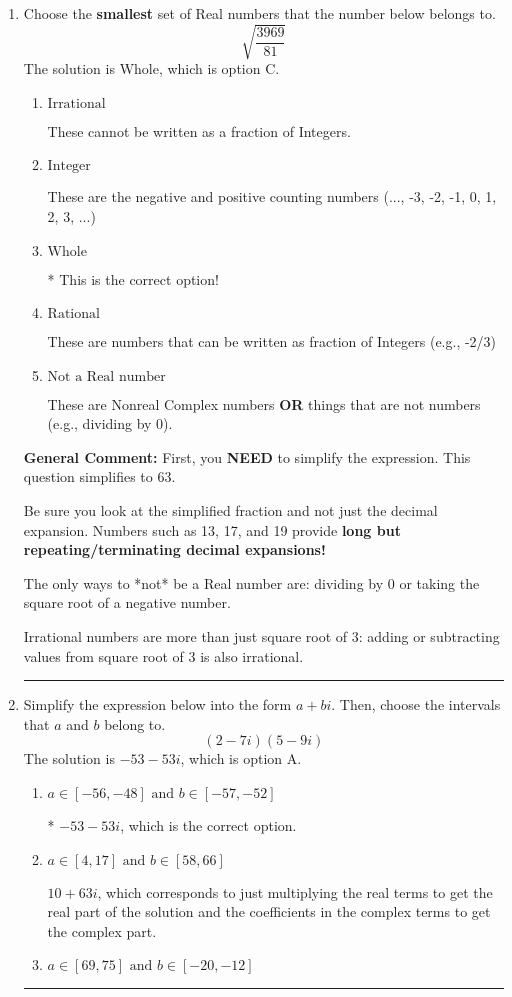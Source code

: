 \documentclass{extbook}[14pt]
\newcommand{\litem}[1]{\item #1

\rule{\textwidth}{0.4pt}}
\begin{document}
\begin{enumerate}\litem{
Choose the \textbf{smallest} set of Real numbers that the number below belongs to.
\[ \sqrt{\frac{3969}{81}} \]The solution is \( \text{Whole} \), which is option C.\begin{enumerate}[label=\Alph*.]
\item \( \text{Irrational} \)

These cannot be written as a fraction of Integers.
\item \( \text{Integer} \)

These are the negative and positive counting numbers (..., -3, -2, -1, 0, 1, 2, 3, ...)
\item \( \text{Whole} \)

* This is the correct option!
\item \( \text{Rational} \)

These are numbers that can be written as fraction of Integers (e.g., -2/3)
\item \( \text{Not a Real number} \)

These are Nonreal Complex numbers \textbf{OR} things that are not numbers (e.g., dividing by 0).
\end{enumerate}

\textbf{General Comment:} First, you \textbf{NEED} to simplify the expression. This question simplifies to $63$. 
 
 Be sure you look at the simplified fraction and not just the decimal expansion. Numbers such as 13, 17, and 19 provide \textbf{long but repeating/terminating decimal expansions!} 
 
 The only ways to *not* be a Real number are: dividing by 0 or taking the square root of a negative number. 
 
 Irrational numbers are more than just square root of 3: adding or subtracting values from square root of 3 is also irrational.
}
\litem{
Simplify the expression below into the form $a+bi$. Then, choose the intervals that $a$ and $b$ belong to.
\[ (2 - 7 i)(5 - 9 i) \]The solution is \( -53 - 53 i \), which is option A.\begin{enumerate}[label=\Alph*.]
\item \( a \in [-56, -48] \text{ and } b \in [-57, -52] \)

* $-53 - 53 i$, which is the correct option.
\item \( a \in [4, 17] \text{ and } b \in [58, 66] \)

 $10 + 63 i$, which corresponds to just multiplying the real terms to get the real part of the solution and the coefficients in the complex terms to get the complex part.
\item \( a \in [69, 75] \text{ and } b \in [-20, -12] \)


\end{enumerate}}
\end{enumerate}
\end{document}
